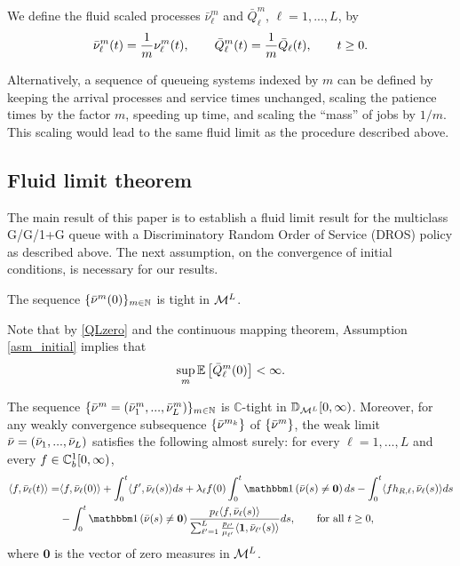 \documentclass{article}
\begin{document}
We define the fluid scaled processes $\bar\nu^m_\ell$ and  $\bar Q_\ell^m$, $\ell=1,...,L$, by
\[
    \bar\nu^m_\ell(t)=\frac{1}{m}\nu^m_\ell(t),\quad\quad \bar {Q}^m_\ell(t)=\frac{1}{m}\bar {Q}_\ell(t),\quad\quad t\geq0.
\]


\begin{remark}
 Alternatively, a sequence of queueing systems indexed by $m$ can be defined by keeping the arrival processes and service times unchanged, scaling the patience times by the factor $m$, speeding up time, and scaling the ``mass'' of jobs by $1/m$. This scaling would lead to the same fluid limit as the procedure described above.
\end{remark}

\subsection{Fluid limit theorem}

The main result of this paper is to establish a fluid limit 
result %
for the multiclass G/G/1+G queue with a Discriminatory Random Order of Service (DROS) policy as described above. The next assumption, on the convergence of initial conditions, is necessary for our results. 

\begin{assumption}\label{asm_initial}
The sequence $\{\bar{\nu}^m(0)\}_{m\in\mathbb{N}}$ is tight in $\mathcal{M}^L$.
\end{assumption}
Note that by \eqref{QLzero} and the continuous mapping theorem, Assumption \ref{asm_initial} implies that
\begin{equation}\label{Q0_bound}
\sup_m \mathbb{E}\left[\bar {Q}^m_\ell(0)\right]<\infty.
\end{equation}




\begin{theorem}\label{thm_conv}
The sequence $\{\bar{\nu}^m=(\bar{\nu}_1^m,...,\bar{\nu}_L^m)\}_{m\in\mathbb{N}}$ is $\mathbb{C}$-tight in $\mathbb{D}_{\mathcal{M}^L}[0,\infty)$. Moreover, for any weakly convergence subsequence 
$\{\bar{\nu}^{m_k}\}$ of $\{\bar{\nu}^m\}$, the weak limit  $\bar{\nu}=(\bar{\nu}_1,...,\bar{\nu}_L)$ satisfies the following almost surely: for every $\ell=1,...,L$ and every $f\in\mathbb{C}_b^{1}[0,\infty)$,
\begin{align}\label{fluid_eq}
  \langle f,\bnu_\ell(t)\rangle  = & \langle f,\bnu_\ell(0)\rangle + \int_0^t\langle f' ,\bnu_\ell(s)\rangle ds +\lambda_\ell f(0)\int_0^t\indic{\bar\nu(s)\neq\mathbf{0}}ds - \int_0^t\langle fh_{R,\ell},\bnu_\ell(s)\rangle ds \\
  &- \int_0^t\indic{\bar\nu(s)\neq \mathbf{0}}\frac{\weight_\ell\langle f,\bnu_\ell(s)\rangle}{\sum_{\ell'=1}^{L}\frac{\weight_{\ell'}}{\mu_{\ell'}}\langle\f1,\bnu_{\ell'}(s)\rangle} ds,\notag\quad\quad \text{for all }t\geq0,
\end{align}
where $\mathbf{0}$ is the vector of zero measures in $\mathcal{M}^L$.
\end{theorem}
\end{document}
